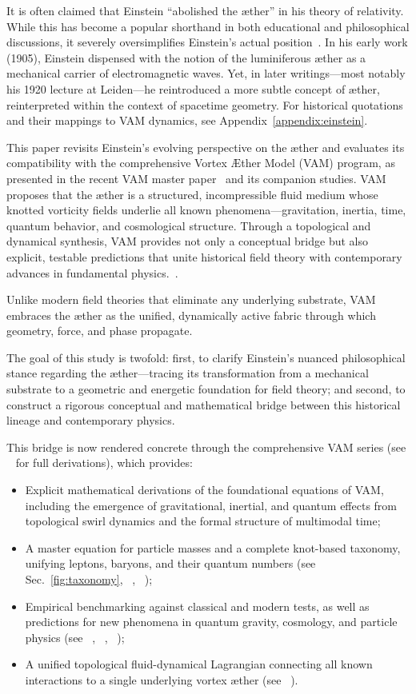 It is often claimed that Einstein ``abolished the æther'' in his theory of relativity. While this has become a popular shorthand in both educational and philosophical discussions, it severely oversimplifies Einstein's actual position~\cite{einstein1920aether}. In his early work (1905), Einstein dispensed with the notion of the luminiferous æther as a mechanical carrier of electromagnetic waves. Yet, in later writings—most notably his 1920 lecture at Leiden—he reintroduced a more subtle concept of æther, reinterpreted within the context of spacetime geometry.
For historical quotations and their mappings to VAM dynamics, see Appendix~\ref{appendix:einstein}.


This paper revisits Einstein’s evolving perspective on the æther and evaluates its compatibility with the comprehensive Vortex Æther Model (VAM) program, as presented in the recent VAM master paper~\cite{VAM-8} and its companion studies. VAM proposes that the æther is a structured, incompressible fluid medium whose knotted vorticity fields underlie all known phenomena—gravitation, inertia, time, quantum behavior, and cosmological structure. Through a topological and dynamical synthesis, VAM provides not only a conceptual bridge but also explicit, testable predictions that unite historical field theory with contemporary advances in fundamental physics.~\cite{VAM-11, VAM-15}.

Unlike modern field theories that eliminate any underlying substrate, VAM embraces the æther as the unified, dynamically active fabric through which geometry, force, and phase propagate.

The goal of this study is twofold: first, to clarify Einstein’s nuanced philosophical stance regarding the æther—tracing its transformation from a mechanical substrate to a geometric and energetic foundation for field theory; and second, to construct a rigorous conceptual and mathematical bridge between this historical lineage and contemporary physics.

This bridge is now rendered concrete through the comprehensive VAM series (see ~\cite{VAM-8} for full derivations), which provides:

\begin{itemize}
    \item Explicit mathematical derivations of the foundational equations of VAM, including the emergence of gravitational, inertial, and quantum effects from topological swirl dynamics and the formal structure of multimodal time;
    \item A master equation for particle masses and a complete knot-based taxonomy, unifying leptons, baryons, and their quantum numbers (see Sec.~\ref{fig:taxonomy}, ~\cite{VAM-8}, ~\cite{VAM-11});
    \item Empirical benchmarking against classical and modern tests, as well as predictions for new phenomena in quantum gravity, cosmology, and particle physics (see ~\cite{VAM-8}, ~\cite{VAM-12}, ~\cite{VAM-15});
    \item A unified topological fluid-dynamical Lagrangian connecting all known interactions to a single underlying vortex æther (see ~\cite{VAM-14}).
\end{itemize}

